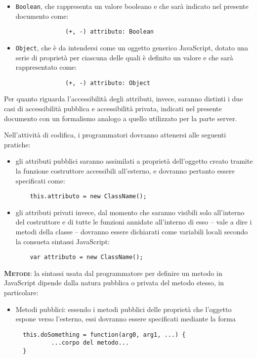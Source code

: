 \begin{description}
\begin{itemize}
			\item \texttt{Boolean}, che rappresenta un valore booleano e che sarà indicato nel presente documento come:
			\begin{verbatim}
			  (+, -) attributo: Boolean
			\end{verbatim}
			
			\item \texttt{Object}, che è da intendersi come un oggetto generico JavaScript, dotato una serie di proprietà per ciascuna delle quali è definito un valore e che sarà rappresentato come:
			\begin{verbatim}
			  (+, -) attributo: Object
			\end{verbatim}
	\end{itemize}
		
Per quanto riguarda l'accessibilità degli attributi, invece, saranno distinti i due casi di accessibilità pubblica e accessibilità privata, indicati nel presente documento con un formalismo analogo a quello utilizzato per la parte server.

Nell'attività di codifica, i programmatori dovranno attenersi alle seguenti pratiche:
\begin{itemize}
  \item gli attributi pubblici saranno assimilati a proprietà dell'oggetto creato tramite la funzione costruttore accessibili all'esterno, e dovranno pertanto essere specificati come:
  \begin{verbatim}
    this.attributo = new ClassName();
  \end{verbatim}
  
  \item gli attributi privati invece, dal momento che saranno visibili solo all'interno del costruttore e di tutte le funzioni annidate all'interno di esso -- vale a dire i metodi della classe -- dovranno essere dichiarati come variabili locali secondo la consueta sintassi JavaScript:
  \begin{verbatim}
    var attributo = new ClassName();
  \end{verbatim}
\end{itemize}
		
	\item{\scshape\bfseries Metodi}: la sintassi usata dal programmatore per definire un metodo in JavaScript dipende dalla natura pubblica o privata del metodo stesso, in particolare:
	\begin{itemize}
	
\item Metodi pubblici: essendo i metodi pubblici delle proprietà che l'oggetto espone verso l'esterno, essi dovranno essere specificati mediante la forma
\begin{verbatim}
  this.doSomething = function(arg0, arg1, ...) {
          ...corpo del metodo...
  }
\end{verbatim}


\end{itemize}
\end{description}
